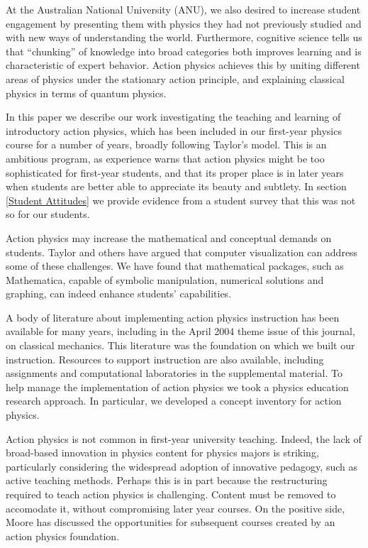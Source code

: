 \documentclass[prb,oncolumn,12pt]{revtex4-2}
\begin{document}
At the Australian National University (ANU), we also desired to increase student engagement by presenting them with physics they had not previously studied and with new ways of understanding the world. Furthermore, cognitive science tells us that ``chunking'' of knowledge into broad categories both improves learning and is characteristic of expert behavior. \cite{Reif,Docktor} Action physics achieves this by uniting different areas of physics under the stationary action principle, and explaining classical physics in terms of quantum physics.

In this paper we describe our work investigating the teaching and learning of introductory action physics, which has been included in our first-year physics course for a number of years, broadly following Taylor's model. This is an ambitious program, as experience warns that action physics might be too sophisticated for first-year students, and that its proper place is in later years when students are better able to appreciate its beauty and subtlety. In section \ref{Student Attitudes} we provide evidence from a student survey that this was not so for our students. 

Action physics may increase the mathematical and conceptual demands on students. 
Taylor \cite{TaylorCIP} and others \cite{Resources} have argued that computer visualization can address some of these challenges. We have found that mathematical packages, such as Mathematica, \cite{Mathematica} capable of symbolic manipulation, numerical solutions and graphing, can indeed enhance students' capabilities.

A body of literature about implementing action physics instruction has been available for many years, \cite{TaylorCIP, Hanc2003, Ogborn, Neuenschwander} including in the April 2004 theme issue of this journal, on classical mechanics. \cite{Moore, HancAJP2004a, HancAJP2004b, HancAJP2004c} This literature was the foundation on which we built our instruction.
Resources to support instruction are also available, \cite{Resources, QEDvideo} including assignments and computational laboratories in the supplemental material. \cite{supplement}  To help manage the implementation of action physics we took a physics education research approach. \cite{McDermott, ethics} In particular, we developed a concept inventory for action physics. \cite{McGinness}

Action physics is not common in first-year university teaching. Indeed, the lack of broad-based innovation in physics content for physics majors is striking, particularly considering the widespread adoption of innovative pedagogy, such as active teaching methods. \cite{Active} Perhaps this is in part because the restructuring required to teach action physics is challenging. Content must be removed to accomodate it, without compromising later year courses. On the positive side, Moore has discussed the opportunities for subsequent courses created by an action physics foundation. \cite{Moore} 
\end{document}

